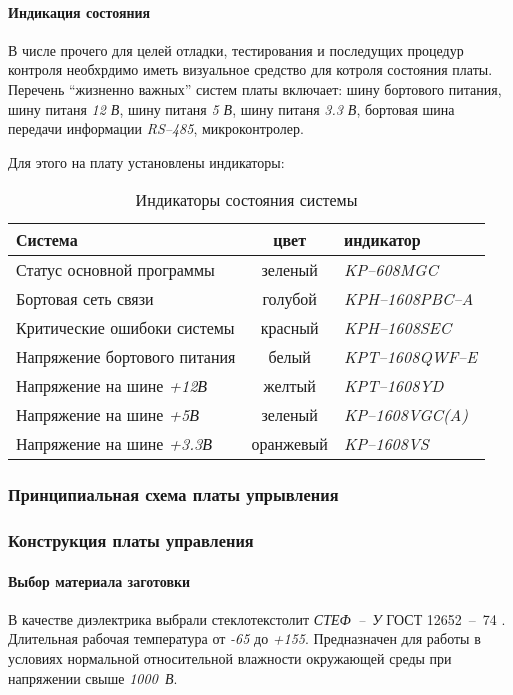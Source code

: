 \paragraph{Индикация состояния}
В числе прочего для целей отладки, тестирования и последущих процедур контроля
необхрдимо иметь визуальное средство для котроля состояния платы.
Перечень ``жизненно важных'' систем платы включает:
шину бортового питания,
шину питаня \textit{12  В},
шину питаня \textit{5   В},
шину питаня \textit{3.3 В},
бортовая шина передачи информации \textit{RS--485},
микроконтролер.

Для этого на плату установлены индикаторы:
\begin{table}[ht!]
    \centering
    \begin{tabular}{|l|c|l|}
        \hline
        Система & цвет & индикатор \\
        \hline
        Статус основной программы & зеленый & \textit{KP--608MGC} \\
        Бортовая сеть связи & голубой & \textit{KPH--1608PBC--A} \\
        Критические ошибоки системы & красный & \textit{KPH--1608SEC} \\
        Напряжение бортового питания & белый & \textit{KPT--1608QWF--E} \\
        Напряжение на шине \textit{+12В} & желтый & \textit{KPT--1608YD} \\
        Напряжение на шине \textit{+5В} & зеленый & \textit{KP--1608VGC(A)} \\
        Напряжение на шине \textit{+3.3В} & оранжевый & \textit{KP--1608VS} \\
        \hline
    \end{tabular}
    \caption{Индикаторы состояния системы}
    \label{boardIndication}
\end{table}

\subsubsection{Принципиальная схема платы упрывления}

\subsubsection{Конструкция платы управления}
\paragraph{Выбор материала заготовки}
В качестве диэлектрика выбрали стеклотекстолит
\textit{СТЕФ~--~У} ГОСТ 12652~--~74 \cite{GOST_12652_74}.
Длительная рабочая температура от \textit{-65\textcelsius}
до \textit{+155\textcelsius}.
Предназначен для работы в условиях нормальной относительной влажности
окружающей среды при напряжении свыше \textit{1000~В}.

